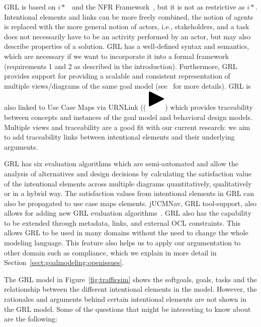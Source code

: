 GRL is based on $i*$~\cite{Yu:1997:TMR:827255.827807} and the NFR Framework~\cite{chung2012non}, but it is not as restrictive as $i*$. Intentional elements and links can be more freely combined, the notion of agents is replaced with the more general notion of actors, i.e., stakeholders, and a task does not necessarily have to be an activity performed by an actor, but may also describe properties of a solution. GRL has a well-defined syntax and semantics, which are necessary if we want to incorporate it into a formal framework (requirements 1 and 2 as described in the introduction). Furthermore, GRL provides support for providing a scalable and consistent representation of multiple views/diagrams of the same goal model (see~\cite[Ch.2]{Ghanavati2013} for more details). GRL is also linked to Use Case Maps via URNLink ((\includegraphics[scale=1]{img/urnlink}) which provides traceability between concepts and instances of the goal model and behavioral design models. Multiple views and traceability are a good fit with our current research: we aim to add traceability links between intentional elements and their underlying arguments. 

GRL has six evaluation algorithms which are semi-automated and allow the analysis of alternatives and design decisions by calculating the satisfaction value of the intentional elements across multiple diagrams quantitatively, qualitatively or in a hybrid way. The satisfaction values from intentional elements in GRL can also be propagated to use case maps elements.  jUCMNav, GRL tool-support, also allows for adding new GRL evaluation algorithms~\cite{jUCMNav}. GRL also has the capability to be extended through metadata, links, and external OCL constraints. This allows GRL to be used in many domains without the need to change the whole modeling language. This feature also helps us to apply our argumentation to other domain such as compliance, which we explain in more detail in Section~\ref{sect:goalmodeling:openissues}.

The GRL model in Figure~\ref{fig:trafficsim} shows the softgoals, goals, tasks and the relationship between the different intentional elements in the model. However, the rationales and arguments behind certain intentional elements are not shown in the GRL model. Some of the questions that might be interesting to know about are the following:


